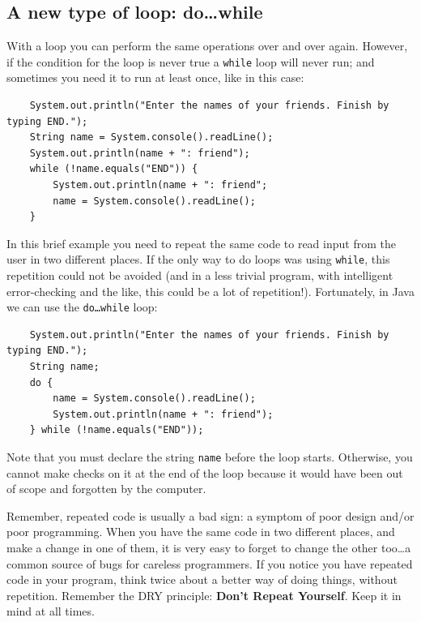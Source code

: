 \subsection{A new type of loop: do\ldots while}
\label{sec:new-type-loop}

With a loop you can perform the same operations over and over
again. However, if the condition for the loop is never true a
\texttt{while} loop will never run; and sometimes you need it to run
at least once, like in this case:

\begin{verbatim}
    System.out.println("Enter the names of your friends. Finish by typing END.");
    String name = System.console().readLine();
    System.out.println(name + ": friend");
    while (!name.equals("END")) {
        System.out.println(name + ": friend";
        name = System.console().readLine();
    }
\end{verbatim}

In this brief example you need to repeat the same code to read input
from the user in two different places. If
the only way to do loops was using \texttt{while}, this repetition
could not be avoided (and in a less trivial program, with
intelligent error-checking and the like, this could be a lot of
repetition!). Fortunately, in Java we can use 
the \texttt{do\ldots while} loop: 

\begin{verbatim}
    System.out.println("Enter the names of your friends. Finish by typing END.");
    String name;
    do {
        name = System.console().readLine();
        System.out.println(name + ": friend");
    } while (!name.equals("END"));
\end{verbatim}

Note that you must declare the string \verb+name+ before the loop
starts. Otherwise, you cannot make checks on it at the end of the loop
because it would have been out of scope and forgotten by the
computer. 

Remember, repeated code is usually a bad sign: a symptom of poor
design and/or poor programming. When you have the same code in two
different places, and make a change in one of them, it is very easy to
forget to change the other too\ldots a common source of bugs for
careless programmers. If you notice you have repeated code in your
program, think twice about a better way of doing things, without
repetition. Remember the DRY principle: \textbf{Don't Repeat
  Yourself}. Keep it in mind at all times.

